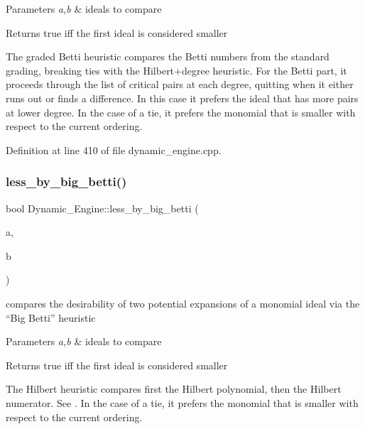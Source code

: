\begin{DoxyParams}{Parameters}
{\em a,b} & ideals to compare \\
\hline
\end{DoxyParams}
\begin{DoxyReturn}{Returns}
{\ttfamily true} iff the first ideal is considered smaller
\end{DoxyReturn}
The graded Betti heuristic compares the Betti numbers from the standard grading, breaking ties with the Hilbert+degree heuristic. For the Betti part, it proceeds through the list of critical pairs at each degree, quitting when it either runs out or finds a difference. In this case it prefers the ideal that has more pairs at lower degree. In the case of a tie, it prefers the monomial that is smaller with respect to the current ordering. 

Definition at line 410 of file dynamic\+\_\+engine.\+cpp.

\mbox{\label{namespace_dynamic___engine_a083c09fdc98db92614d126a5cca19a24}} 
\subsubsection{\texorpdfstring{less\+\_\+by\+\_\+big\+\_\+betti()}{less\_by\_big\_betti()}}
{\footnotesize\ttfamily bool Dynamic\+\_\+\+Engine\+::less\+\_\+by\+\_\+big\+\_\+betti (\begin{DoxyParamCaption}\item[{\hyperlink{group___g_b_computation_class_dynamic___engine_1_1_p_p___with___ideal}{P\+P\+\_\+\+With\+\_\+\+Ideal} \&}]{a,  }\item[{\hyperlink{group___g_b_computation_class_dynamic___engine_1_1_p_p___with___ideal}{P\+P\+\_\+\+With\+\_\+\+Ideal} \&}]{b }\end{DoxyParamCaption})}



compares the desirability of two potential expansions of a monomial ideal via the ``Big Betti'' heuristic 


\begin{DoxyParams}{Parameters}
{\em a,b} & ideals to compare \\
\hline
\end{DoxyParams}
\begin{DoxyReturn}{Returns}
{\ttfamily true} iff the first ideal is considered smaller
\end{DoxyReturn}
The Hilbert heuristic compares first the Hilbert polynomial, then the Hilbert numerator. See \cite{CaboaraDynAlg}. In the case of a tie, it prefers the monomial that is smaller with respect to the current ordering. 

